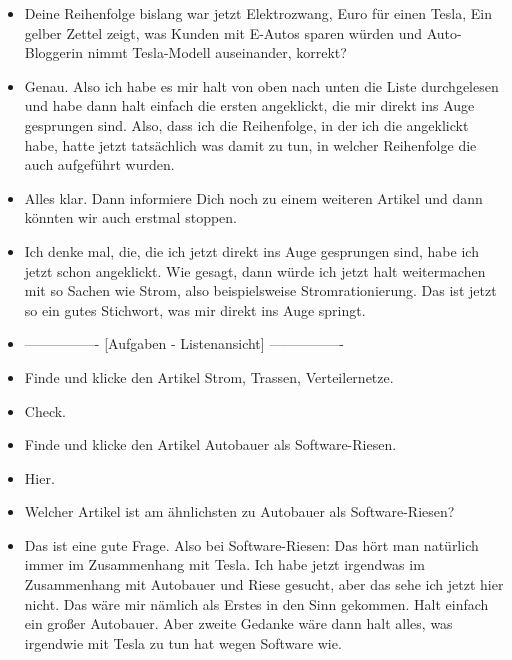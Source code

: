 {\begin{itemize}[]
    Nachdem ich die durch habe, würde ich dann halt in Richtung Strom gehen.
    Das wäre so mein Vorgehen, dass ich halt zuerst das, was wirklich direkt sich ums Auto dreht, anklicke und dann im Nachhinein halt alles, was mehr oder weniger indirekt damit zu tun hat.
    \item {} Deine Reihenfolge bislang war jetzt \flqq Elektrozwang\frqq{},  Euro für einen Tesla\frqq{}, \flqq Ein gelber Zettel zeigt, was Kunden mit E-Autos sparen würden\frqq{} und \flqq Auto-Bloggerin nimmt Tesla-Modell auseinander\frqq{}, korrekt?
    \item {} Genau.
    Also ich habe es mir halt von oben nach unten die Liste durchgelesen und habe dann halt einfach die ersten angeklickt, die mir direkt ins Auge gesprungen sind.
    Also, dass ich die Reihenfolge, in der ich die angeklickt habe, hatte jetzt tatsächlich was damit zu tun, in welcher Reihenfolge die auch aufgeführt wurden.
    \item {} Alles klar. Dann informiere Dich noch zu einem weiteren Artikel und dann könnten wir auch erstmal stoppen.
    \item {} Ich denke mal, die, die ich jetzt direkt ins Auge gesprungen sind, habe ich jetzt schon angeklickt.
    Wie gesagt, dann würde ich jetzt halt weitermachen mit so Sachen wie Strom, also beispielsweise \flqq Stromrationierung\frqq{}. Das ist jetzt so ein gutes Stichwort, was mir direkt ins Auge springt.
    \item {----------------} [Aufgaben - Listenansicht] {----------------}
    \item {} Finde und klicke den Artikel \flqq Strom, Trassen, Verteilernetze\frqq{}.
    \item {} Check.
    \item {} Finde und klicke den Artikel \flqq Autobauer als Software-Riesen\frqq{}.
    \item {} Hier.
    \item {} Welcher Artikel ist am ähnlichsten zu \flqq Autobauer als Software-Riesen\frqq{}?
    \item {} Das ist eine gute Frage. 
    Also bei Software-Riesen: Das hört man natürlich immer im Zusammenhang mit Tesla.
    Ich habe jetzt irgendwas im Zusammenhang mit Autobauer und Riese gesucht, aber das sehe ich jetzt hier nicht.
    Das wäre mir nämlich als Erstes in den Sinn gekommen.
    Halt einfach ein großer Autobauer.
    Aber zweite Gedanke wäre dann halt alles, was irgendwie mit Tesla zu tun hat wegen Software wie.

\end{itemize}}
